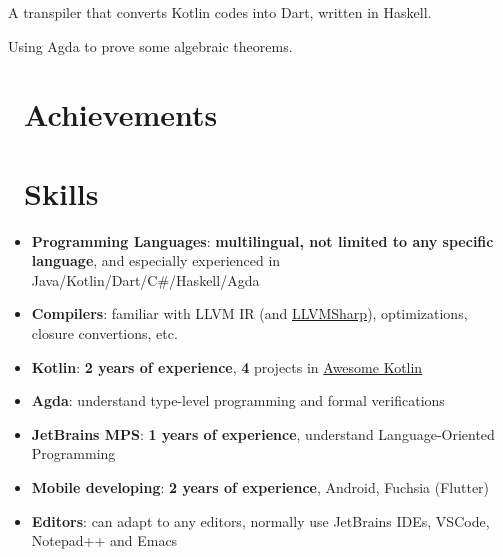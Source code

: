 \documentclass{resume}
\begin{document}
A transpiler that converts Kotlin codes into Dart, written in Haskell.

Using Agda to prove some algebraic theorems.


\section{\faHeartO\ Achievements}

\section{\faCogs\ Skills}
\begin{itemize}[parsep=0.5ex]
  \item \textbf{Programming Languages}:
    \textbf{multilingual, not limited to any specific language},
    and especially experienced in Java/Kotlin/Dart/C\#/Haskell/Agda

  \item \textbf{Compilers}:
    familiar with LLVM IR (and \href{https://github.com/Microsoft/LLVMSharp/} {LLVMSharp}), optimizations, closure convertions, etc.

  \item \textbf{Kotlin}:
    \textbf{2 years of experience},
    \textbf{4} projects in
    \href{https://kotlin.link/?q=ice} {Awesome Kotlin}

  \item \textbf{Agda}:
    understand type-level programming and formal verifications

  \item \textbf{JetBrains MPS}:
    \textbf{1 years of experience},
    understand Language-Oriented Programming

  \item \textbf{Mobile developing}:
    \textbf{2 years of experience},
    Android, Fuchsia (Flutter)

  \item \textbf{Editors}:
    can adapt to any editors, normally use JetBrains IDEs, VSCode, Notepad++ and Emacs
\end{itemize}
\end{document}
